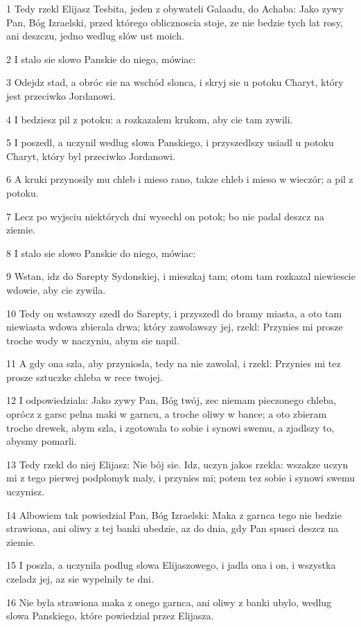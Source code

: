 \par 1 Tedy rzekl Elijasz Tesbita, jeden z obywateli Galaadu, do Achaba: Jako zywy Pan, Bóg Izraelski, przed którego oblicznoscia stoje, ze nie bedzie tych lat rosy, ani deszczu, jedno wedlug slów ust moich.
\par 2 I stalo sie slowo Panskie do niego, mówiac:
\par 3 Odejdz stad, a obróc sie na wschód slonca, i skryj sie u potoku Charyt, który jest przeciwko Jordanowi.
\par 4 I bedziesz pil z potoku: a rozkazalem krukom, aby cie tam zywili.
\par 5 I poszedl, a uczynil wedlug slowa Panskiego, i przyszedlszy usiadl u potoku Charyt, który byl przeciwko Jordanowi.
\par 6 A kruki przynosily mu chleb i mieso rano, takze chleb i mieso w wieczór; a pil z potoku.
\par 7 Lecz po wyjsciu niektórych dni wysechl on potok; bo nie padal deszcz na ziemie.
\par 8 I stalo sie slowo Panskie do niego, mówiac:
\par 9 Wstan, idz do Sarepty Sydonskiej, i mieszkaj tam; otom tam rozkazal niewiescie wdowie, aby cie zywila.
\par 10 Tedy on wstawszy szedl do Sarepty, i przyszedl do bramy miasta, a oto tam niewiasta wdowa zbierala drwa; który zawolawszy jej, rzekl: Przynies mi prosze troche wody w naczyniu, abym sie napil.
\par 11 A gdy ona szla, aby przyniosla, tedy na nie zawolal, i rzekl: Przynies mi tez prosze sztuczke chleba w rece twojej.
\par 12 I odpowiedziala: Jako zywy Pan, Bóg twój, zec niemam pieczonego chleba, oprócz z garsc pelna maki w garncu, a troche oliwy w bance; a oto zbieram troche drewek, abym szla, i zgotowala to sobie i synowi swemu, a zjadlszy to, abysmy pomarli.
\par 13 Tedy rzekl do niej Elijasz: Nie bój sie. Idz, uczyn jakos rzekla: wszakze uczyn mi z tego pierwej podplomyk maly, i przynies mi; potem tez sobie i synowi swemu uczynisz.
\par 14 Albowiem tak powiedzial Pan, Bóg Izraelski: Maka z garnca tego nie bedzie strawiona, ani oliwy z tej banki ubedzie, az do dnia, gdy Pan spusci deszcz na ziemie.
\par 15 I poszla, a uczynila podlug slowa Elijaszowego, i jadla ona i on, i wszystka czeladz jej, az sie wypelnily te dni.
\par 16 Nie byla strawiona maka z onego garnca, ani oliwy z banki ubylo, wedlug slowa Panskiego, które powiedzial przez Elijasza.
